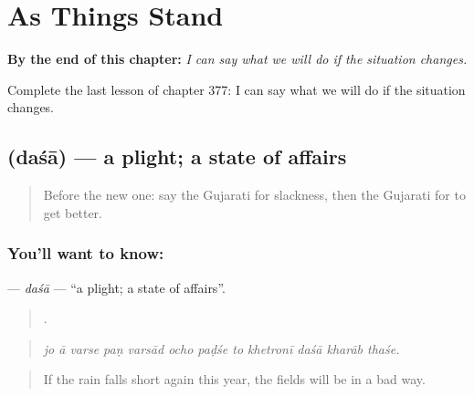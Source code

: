 
\chapter{As Things Stand}
\label{ch:gu-as-things-stand}

\begin{chapteropening}
\textbf{By the end of this chapter:} \emph{I can say what we will do if the situation changes.}

Complete the last lesson of chapter 377: I can say what we will do if the situation changes.
\end{chapteropening}

\section[\texorpdfstring{\gu{દશા} (daśā)}{દશા (daśā)}]{ (daśā) — a plight; a state of affairs}

\label{lesson:GU-C377-dasa}



\begin{quote}
Before the new one: say the Gujarati for slackness, then the Gujarati for to get better.
\end{quote}

\subsection*{You'll want to know: }
\textbf{} — \emph{daśā} — \textquotedblleft{}a plight; a state of affairs\textquotedblright{}.

\begin{quote}
           .
\end{quote}

\begin{quote}
\emph{jo ā varse paṇ varsād ocho paḍśe to khetronī daśā kharāb thaśe.}
\end{quote}

\begin{quote}
If the rain falls short again this year, the fields will be in a bad way.
\end{quote}

